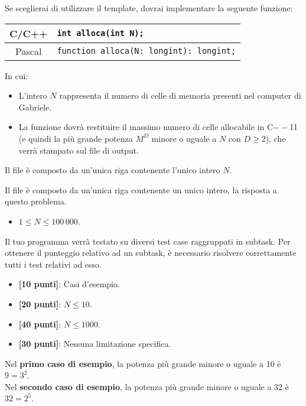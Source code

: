 Se sceglierai di utilizzare il template, dovrai implementare la seguente funzione:
\begin{center}\begin{tabularx}{\textwidth}{|c|X|}
\hline
C/C++  & \verb|int alloca(int N);|\\
\hline
Pascal & \verb|function alloca(N: longint): longint;|\\
\hline
\end{tabularx}\end{center}
In cui:
\begin{itemize}[nolistsep]
  \item L'intero $N$ rappresenta il numero di celle di memoria presenti nel computer di Gabriele.
  \item La funzione dovrà restituire il massimo numero di celle allocabile in C$--$11 (e quindi la più grande potenza $M^D$ minore o uguale a $N$ con $D \ge 2$), che verrà stampato sul file di output.
\end{itemize}

\InputFile
Il file  è composto da un'unica riga contenente l'unico intero $N$.

\OutputFile
Il file \outputfile{} è composto da un'unica riga contenente un unico intero, la risposta a questo problema.

\Constraints
\begin{itemize}[nolistsep, itemsep=2mm]
	\item $1 \le N \le 100\,000$.
\end{itemize}

\pagebreak
\Scoring
Il tuo programma verrà testato su diversi test case raggruppati in subtask.
Per ottenere il punteggio relativo ad un subtask, è necessario risolvere
correttamente tutti i test relativi ad esso.

\begin{itemize}[nolistsep,itemsep=2mm]
  \item \textbf{ [10 punti]}: Casi d'esempio.
  \item \textbf{ [20 punti]}: $N \leq 10$.
  \item \textbf{ [40 punti]}: $N \leq 1000$.
  \item \textbf{ [30 punti]}: Nessuna limitazione specifica.
\end{itemize}

\Examples
\begin{example}
%
\end{example}
\begin{example}
%
\end{example}


\Explanation
Nel \textbf{primo caso di esempio}, la potenza più grande minore o uguale a 10 è $9 = 3^2$.\\[2mm]
Nel \textbf{secondo caso di esempio}, la potenza più grande minore o uguale a 32 è $32 = 2^5$.
